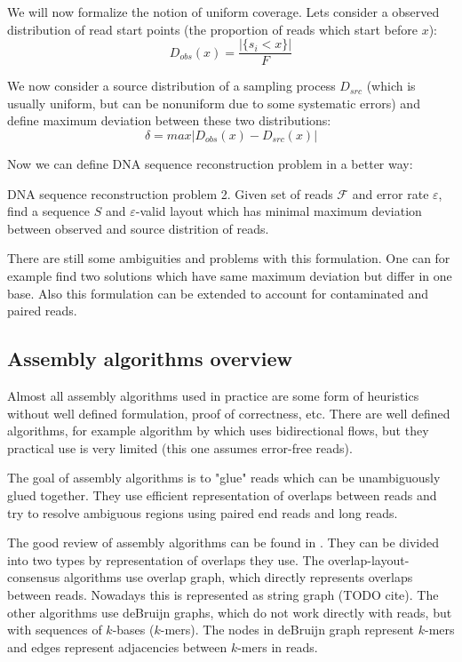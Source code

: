 We will now formalize the notion of uniform coverage. Lets consider a observed
distribution of read start points (the proportion of reads which start before $x$):
$$D_{obs}(x) = \frac{|\{s_i < x\}|}{F}$$

We now consider a source distribution of a sampling process $D_{src}$ (which is usually
uniform, but can be nonuniform due to some systematic errors) and define maximum
deviation between these two distributions:
$$\delta = max |D_{obs}(x) - D_{src}(x)|$$

Now we can define DNA sequence reconstruction problem in a better way:

\begin{definition}{DNA sequence reconstruction problem 2.}
Given set of reads $\mathcal{F}$ and error rate $\varepsilon$, find
a sequence $S$ and $\varepsilon$-valid layout which has minimal
maximum deviation between observed and source distrition of reads.
\end{definition}

There are still some ambiguities and problems with this formulation.
One can for example find two solutions which have same maximum deviation
but differ in one base.
Also this formulation can be extended to account for contaminated and paired
reads.

\subsection{Assembly algorithms overview}

Almost all assembly algorithms used in practice are some form of heuristics
without well defined formulation, proof of correctness, etc.
There are well defined algorithms, for example algorithm by \cite{Medvedev2009}
which uses bidirectional flows, but they practical use is very limited (this one
assumes error-free reads).

The goal of assembly algorithms is to "glue" reads which can be unambiguously glued together.
They use efficient representation of overlaps between reads and try to resolve
ambiguous regions using paired end reads and long reads.

The good review of assembly algorithms can be found in \cite{miller2010assembly}.
They can be divided into two types by representation of overlaps they use.
The overlap-layout-consensus algorithms use overlap graph, which directly represents
overlaps between reads. Nowadays this is represented as string graph (TODO cite).
The other algorithms use deBruijn graphs, which do not work directly with reads, but
with sequences of $k$-bases ($k$-mers). The nodes in deBruijn graph represent $k$-mers
and edges represent adjacencies between $k$-mers in reads. 
